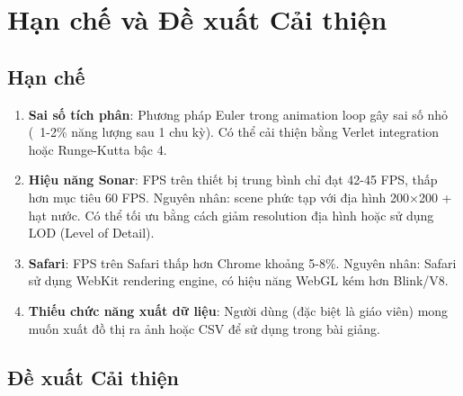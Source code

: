 \section{Hạn chế và Đề xuất Cải thiện}

\subsection{Hạn chế}

\begin{enumerate}
    \item \textbf{Sai số tích phân}: Phương pháp Euler trong animation loop gây sai số nhỏ (~1-2\% năng lượng sau 1 chu kỳ). Có thể cải thiện bằng Verlet integration hoặc Runge-Kutta bậc 4.
    
    \item \textbf{Hiệu năng Sonar}: FPS trên thiết bị trung bình chỉ đạt 42-45 FPS, thấp hơn mục tiêu 60 FPS. Nguyên nhân: scene phức tạp với địa hình 200×200 + hạt nước. Có thể tối ưu bằng cách giảm resolution địa hình hoặc sử dụng LOD (Level of Detail).
    
    \item \textbf{Safari}: FPS trên Safari thấp hơn Chrome khoảng 5-8\%. Nguyên nhân: Safari sử dụng WebKit rendering engine, có hiệu năng WebGL kém hơn Blink/V8.
    
    \item \textbf{Thiếu chức năng xuất dữ liệu}: Người dùng (đặc biệt là giáo viên) mong muốn xuất đồ thị ra ảnh hoặc CSV để sử dụng trong bài giảng.
\end{enumerate}

\subsection{Đề xuất Cải thiện}

